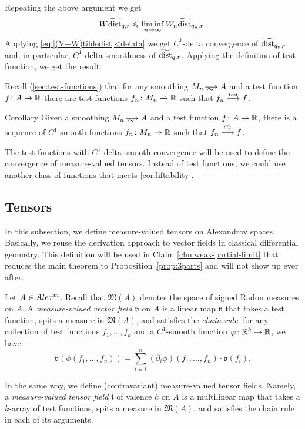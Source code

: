 Repeating the above argument we get 
\[W\widetilde{\operatorname{\rm dist}}_{q,r}\leqslant  \liminf_{n\to\infty}W_n\widetilde{\operatorname{\rm dist}}_{q_n,r}.\]
Applying \ref{eq:|(V+W)tildedist|<delata} we get $C^1$-delta convergence of $\widetilde{\operatorname{\rm dist}}_{q_n,r}$ and, in particular, $C^1$-delta smoothness of $\widetilde{\operatorname{\rm dist}}_{q,r}$.
Applying the definition of test function, we get the result.
\qeds

Recall (\ref{sec:test-functions}) that for any smoothing $M_n\smooths{} A$ and a test function $f\colon A\to\mathbb{R}$ there are test functions  $f_n\colon M_n\to \mathbb{R}$ such that $f_n\stackrel{\text{\tiny\rm test}}{\longrightarrow} f$.

\begin{thm}{Corollary}\label{cor:liftability}
Given a smoothing $M_n\smooths{} A$ and a test function $f\colon A\to\mathbb{R}$,
there is a sequence of $C^1$-smooth functions $f_n\colon M_n\to \mathbb{R}$ such that $f_n\stackrel{C^1_\delta}{\longrightarrow} f$.
\end{thm}

The test functions with $C^1$-delta smooth convergence will be used to define the convergence of measure-valued tensors.
Instead of test functions, we could use another class of functions that meets \ref{cor:liftability}.

 
\subsection{Tensors}\label{subsec:tensors}

In this subsection, we define measure-valued tensors on Alexandrov spaces.
Basically, we reuse the derivation approach to vector fields in classical differential geometry.
This definition will be used in Claim \ref{clm:weak-partial-limit} that reduces the main theorem to Proposition~\ref{prop:3parts} and will not show up ever after.

Let $A\in \mathcal{A}lex^m$.
Recall that $\mathfrak M(A)$
denotes the space of signed Radon measures on $A$.
A \emph{measure-valued vector field} $\mathfrak{v}$  on $A$
is a linear map
$\mathfrak{v}$ that takes a test function,
spits a measure in $\mathfrak M(A)$,
and satisfies the \emph{chain rule}:
for any collection of test functions $f_1,\dots,f_k$
and a $C^1$-smooth function $\varphi\colon\mathbb{R}^k\to\mathbb{R}$, we have
$$\mathfrak{v}(\phi(f_1,\dots,f_n))
=
\sum_{i=1}^n (\partial_i\phi)(f_1,\dots,f_n)\cdot\mathfrak{v}(f_i).
$$

In the same way, we define (contravariant) measure-valued tensor fields.
Namely, a \emph{measure-valued tensor field} $\mathfrak{t}$ of valence $k$ on $A$ is a multilinear map that takes a $k$-array of test  functions, spits a measure in $\mathfrak M(A)$, and satisfies the chain rule in each of its arguments.

